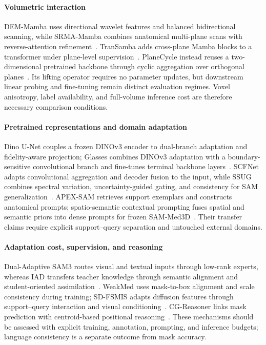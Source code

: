 \documentclass[5p,times,authoryear]{elsarticle}
\begin{document}
\paragraph{Volumetric interaction}
DEM-Mamba uses directional wavelet features and balanced bidirectional scanning, while SRMA-Mamba combines anatomical multi-plane scans with reverse-attention refinement~\citep{zhu2026demmamba_context,zeng2026srmamamba_context}. TranSamba adds cross-plane Mamba blocks to a transformer under plane-level supervision~\citep{lyu2026transamba_context}. PlaneCycle instead reuses a two-dimensional pretrained backbone through cyclic aggregation over orthogonal planes~\citep{yu2026planecycle_context}. Its lifting operator requires no parameter updates, but downstream linear probing and fine-tuning remain distinct evaluation regimes. Voxel anisotropy, label availability, and full-volume inference cost are therefore necessary comparison conditions.

\paragraph{Pretrained representations and domain adaptation}
Dino U-Net couples a frozen DINOv3 encoder to dual-branch adaptation and fidelity-aware projection; Glasses combines DINOv3 adaptation with a boundary-sensitive convolutional branch and fine-tunes terminal backbone layers~\citep{li2026dinounet_context,zhu2026glasses_context}. SCFNet adapts convolutional aggregation and decoder fusion to the input, while SSUG combines spectral variation, uncertainty-guided gating, and consistency for SAM generalization~\citep{tang2026scfnet_context,li2026ssug_context}. APEX-SAM retrieves support exemplars and constructs anatomical prompts; spatio-semantic contextual prompting fuses spatial and semantic priors into dense prompts for frozen SAM-Med3D~\citep{mao2026apexsam_context,chattopadhyay2026contextprompts_context}. Their transfer claims require explicit support--query separation and untouched external domains.

\paragraph{Adaptation cost, supervision, and reasoning}
Dual-Adaptive SAM3 routes visual and textual inputs through low-rank experts, whereas IAD transfers teacher knowledge through semantic alignment and student-oriented assimilation~\citep{chen2026dasam3_context,hong2026iad_context}. WeakMed uses mask-to-box alignment and scale consistency during training; SD-FSMIS adapts diffusion features through support--query interaction and visual conditioning~\citep{wei2026weakmed_context,li2026sdfsmis_context}. CG-Reasoner links mask prediction with centroid-based positional reasoning~\citep{polamreddy2026cgreasoner_context}. These mechanisms should be assessed with explicit training, annotation, prompting, and inference budgets; language consistency is a separate outcome from mask accuracy.
\end{document}
